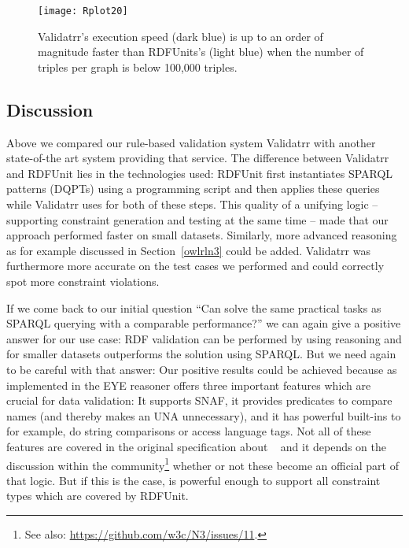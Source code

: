 \begin{figure}[t]
\begin{center}
    \texttt{[image: Rplot20]} %
\caption{Validatrr's execution speed (dark blue) is up to an order of magnitude faster than RDFUnits's (light blue) when the number of triples per \rdf graph is below 100,000 triples.}
	\label{fig:eval-size}
	\end{center}
\end{figure}


\subsection{Discussion}\label{conc}
Above we compared our rule-based \rdf validation system Validatrr with another state-of-the art system providing that service. The difference between Validatrr and RDFUnit 
lies in the technologies used: RDFUnit first instantiates SPARQL patterns (DQPTs) using a programming script and then applies these queries 
while Validatrr uses \nthreelogic for both of these steps. %
This quality of a unifying logic -- supporting constraint generation and testing at the same time -- made that our approach performed faster on small datasets. Similarly,
more advanced reasoning as for example
discussed in Section~\ref{owlrln3} could be added.
Validatrr was furthermore more accurate on the test cases we 
performed and could correctly spot more constraint violations.

If we come back to our initial question ``Can \nthree solve the same practical tasks as SPARQL querying with a comparable performance?'' 
we can again give a positive answer for our use case: RDF validation can 
be performed by using \nthree reasoning and for smaller datasets \nthree outperforms the solution using SPARQL. 
But we need again to be careful with that answer: 
Our positive results could be achieved because \nthree as implemented in the EYE reasoner 
offers three important features which are crucial for data validation: It supports SNAF, it provides predicates to compare names (and thereby makes an UNA unnecessary), and it
has powerful built-ins to for example, 
do string comparisons or access language tags. Not all of these features are covered in the original specification 
about \nthreelogic~\cite{Notation3,N3Logic} and it depends on the discussion within the community\footnote{See also: \url{https://github.com/w3c/N3/issues/11}.} whether or not these
become an official part of that logic. But if this is the case, \nthree is powerful enough to support all constraint types which are covered by RDFUnit.


